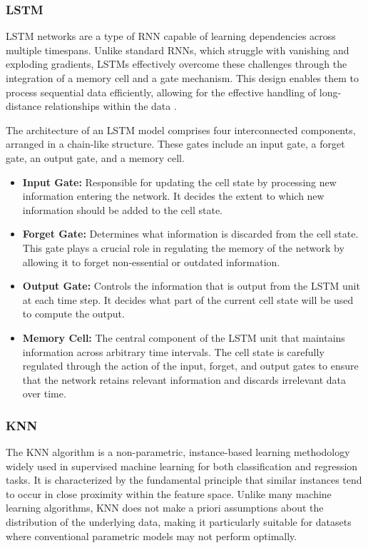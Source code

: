 \documentclass{article} %
\begin{document}
\subsubsection{LSTM}
\Gls*{LSTM} networks are a type of \gls*{RNN} capable of learning dependencies across multiple timespans. Unlike standard \glspl*{RNN}, which struggle with vanishing and exploding gradients, LSTMs effectively overcome these challenges through the integration of a memory cell and a gate mechanism. This design enables them to process sequential data efficiently, allowing for the effective handling of long-distance relationships within the data \cite{hochreiter1997long}.

The architecture of an \Gls*{LSTM} model comprises four interconnected components, arranged in a chain-like structure. These gates include an input gate, a forget gate, an output gate, and a memory cell.

\begin{itemize}
    \item \textbf{Input Gate:} Responsible for updating the cell state by processing new information entering the network. It decides the extent to which new information should be added to the cell state.
    \item \textbf{Forget Gate:} Determines what information is discarded from the cell state. This gate plays a crucial role in regulating the memory of the network by allowing it to forget non-essential or outdated information.
    \item \textbf{Output Gate:} Controls the information that is output from the LSTM unit at each time step. It decides what part of the current cell state will be used to compute the output.
    \item \textbf{Memory Cell:} The central component of the LSTM unit that maintains information across arbitrary time intervals. The cell state is carefully regulated through the action of the input, forget, and output gates to ensure that the network retains relevant information and discards irrelevant data over time.
\end{itemize}


\subsubsection{KNN}
The \gls*{KNN} algorithm is a non-parametric, instance-based learning methodology widely used in supervised machine learning for both classification and regression tasks. It is characterized by the fundamental principle that similar instances tend to occur in close proximity within the feature space. Unlike many machine learning algorithms, \gls*{KNN} does not make a priori assumptions about the distribution of the underlying data, making it particularly suitable for datasets where conventional parametric models may not perform optimally.
\end{document}
